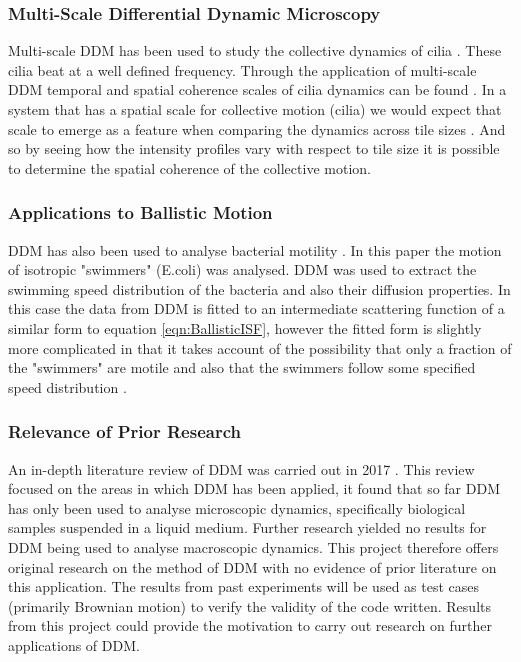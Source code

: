 \documentclass[10pt]{article}
\begin{document}
\subsubsection{Multi-Scale Differential Dynamic Microscopy}
Multi-scale DDM has been used to study the collective dynamics of cilia \cite{ddm2}. These cilia beat at a well defined frequency. Through the application of multi-scale DDM temporal and spatial coherence scales of cilia dynamics can be found \cite{ddm1}. In a system that has a spatial scale for collective motion (cilia) we would expect that scale to emerge as a feature when comparing the dynamics across tile sizes \cite{ddm1}. And so by seeing how the intensity profiles vary with respect to tile size it is possible to determine the spatial coherence of the collective motion.

\subsubsection{Applications to Ballistic Motion}
DDM has also been used to analyse bacterial motility \cite{bacterial_motility}. In this paper the motion of isotropic "swimmers" (E.coli) was analysed. DDM was used to extract the swimming speed distribution of the bacteria and also their diffusion properties. In this case the data from DDM is fitted to an intermediate scattering function of a similar form to equation \ref{eqn:BallisticISF}, however the fitted form is slightly more complicated in that it takes account of the possibility that only a fraction of the "swimmers" are motile and also that the swimmers follow some specified speed distribution \cite{bacterial_motility}.

\subsubsection{Relevance of Prior Research}
An in-depth literature review of DDM was carried out in 2017 \cite{ddm1}. This review focused on the areas in which DDM has been applied, it found that so far DDM has only been used to analyse microscopic dynamics, specifically biological samples suspended in a liquid medium. Further research yielded no results for DDM being used to analyse macroscopic dynamics. This project therefore offers original research on the method of DDM with no evidence of prior literature on this application. The results from past experiments will be used as test cases (primarily Brownian motion) to verify the validity of the code written. Results from this project could provide the motivation to carry out research on further applications of DDM.
\end{document}
